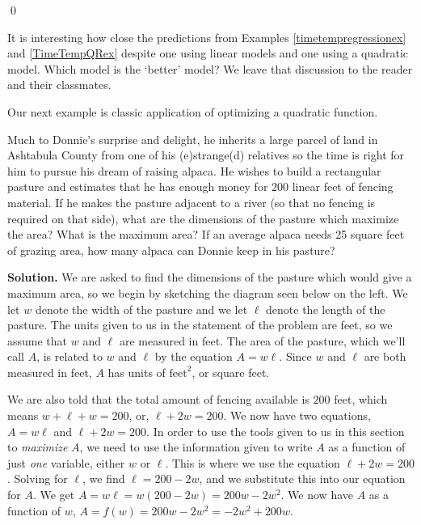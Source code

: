 \begin{ex}
\begin{enumerate}
\begin{center}
 \end{center}
 
 \qed
 
 \end{enumerate}
 
 \end{ex}

It is interesting how close the predictions from  Examples \ref{timetempregressionex} and  \ref{TimeTempQRex} despite one using linear models and one using a quadratic model.  Which model is the `better' model?  We leave that discussion to the reader and their classmates.

\medskip

Our next example is classic application of optimizing a quadratic function.

\begin{ex} \label{donniealpaca} Much to Donnie's surprise and delight, he inherits a large parcel of land in Ashtabula County from one of his (e)strange(d) relatives so the time is right for him to pursue his dream of raising alpaca.  He wishes to build a rectangular pasture and estimates that he has enough money for 200 linear feet of fencing material.  If he makes the pasture adjacent to a river (so that no fencing is required on that side), what are the dimensions of the pasture which maximize the area?  What is the maximum area?  If an average alpaca needs 25 square feet of grazing area, how many alpaca can Donnie keep in his pasture?

\pagebreak

{\bf Solution.} We are asked to find the dimensions of the pasture which would give a maximum area, so we begin by sketching the diagram seen below on the left.  We let $w$ denote the width of the pasture and we let $\ell$ denote the length of the pasture.  The units given to us in the statement of the problem are feet, so we assume that $w$ and $\ell$ are measured in feet.  The area of the pasture, which we'll call $A$, is related to $w$ and $\ell$ by the equation $A = w \ell$.  Since $w$ and $\ell$ are both measured in feet, $A$ has units of $\text{feet}^2$, or square feet.  

\medskip

We are also told that the total amount of fencing available is $200$ feet, which means $w + \ell + w = 200$, or, $\ell+2w = 200$.  We now have two equations, $A = w \ell$ and $\ell+2w = 200$.  In order to use the tools given to us in this section to \textit{maximize} $A$, we need to use the information given to write $A$ as a function of just \textit{one} variable, either $w$ or $\ell$. This is where we use the equation $\ell+2w = 200$.  Solving for $\ell$, we find $\ell = 200-2w$, and we substitute this into our equation for $A$.  We get $A = w \ell = w(200-2w) = 200w-2w^2$.  We now have $A$ as a function of $w$, $A = f(w) = 200w-2w^2 = -2w^2+200w$. 


\end{ex}
